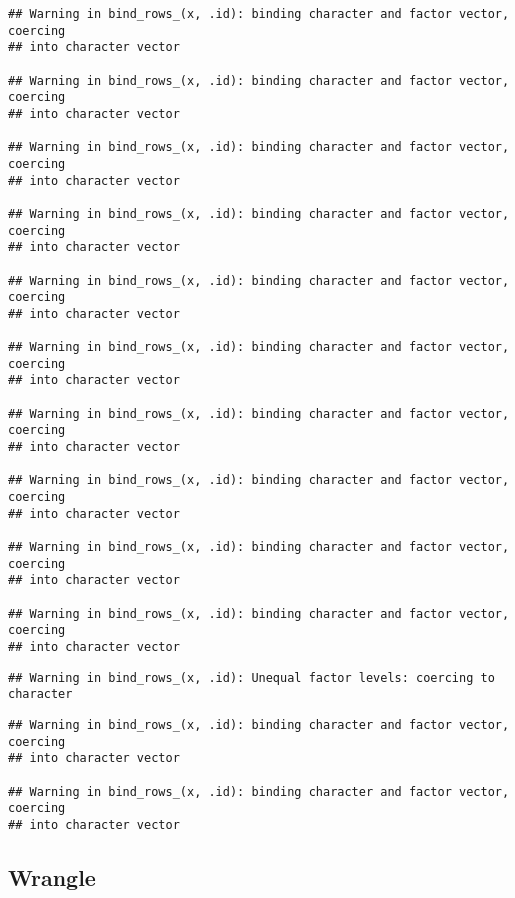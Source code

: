 \documentclass[
]{article}
\begin{document}
\begin{verbatim}
## Warning in bind_rows_(x, .id): binding character and factor vector, coercing
## into character vector

## Warning in bind_rows_(x, .id): binding character and factor vector, coercing
## into character vector

## Warning in bind_rows_(x, .id): binding character and factor vector, coercing
## into character vector

## Warning in bind_rows_(x, .id): binding character and factor vector, coercing
## into character vector

## Warning in bind_rows_(x, .id): binding character and factor vector, coercing
## into character vector

## Warning in bind_rows_(x, .id): binding character and factor vector, coercing
## into character vector

## Warning in bind_rows_(x, .id): binding character and factor vector, coercing
## into character vector

## Warning in bind_rows_(x, .id): binding character and factor vector, coercing
## into character vector

## Warning in bind_rows_(x, .id): binding character and factor vector, coercing
## into character vector

## Warning in bind_rows_(x, .id): binding character and factor vector, coercing
## into character vector
\end{verbatim}

\begin{verbatim}
## Warning in bind_rows_(x, .id): Unequal factor levels: coercing to character
\end{verbatim}

\begin{verbatim}
## Warning in bind_rows_(x, .id): binding character and factor vector, coercing
## into character vector

## Warning in bind_rows_(x, .id): binding character and factor vector, coercing
## into character vector
\end{verbatim}

\hypertarget{wrangle}{%
\subsection{Wrangle}\label{wrangle}}
\end{document}
